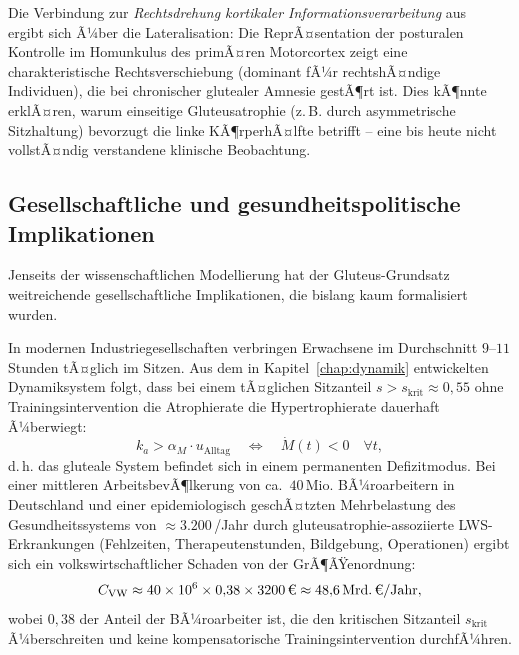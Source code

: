 ﻿\documentclass[12pt,a4paper]{report}
\theoremstyle{plain}
\theoremstyle{definition}
\theoremstyle{remark}
\newcommand{\euro}{\texteuro}    %
\begin{document}
	Die Verbindung zur \emph{Rechtsdrehung kortikaler Informationsverarbeitung}
	aus~\cite{epp2026wolke} ergibt sich Ã¼ber die Lateralisation:
	Die ReprÃ¤sentation der posturalen Kontrolle im Homunkulus des
	primÃ¤ren Motorcortex zeigt eine charakteristische Rechtsverschiebung
	(dominant fÃ¼r rechtshÃ¤ndige Individuen), die bei chronischer
	glutealer Amnesie gestÃ¶rt ist. Dies kÃ¶nnte erklÃ¤ren, warum
	einseitige Gluteusatrophie (z.\,B. durch asymmetrische Sitzhaltung)
	bevorzugt die linke KÃ¶rperhÃ¤lfte betrifft -- eine bis heute nicht
	vollstÃ¤ndig verstandene klinische Beobachtung.
	
	\subsection{Gesellschaftliche und gesundheitspolitische Implikationen}
	\label{subsec:gesellschaft}
	
	Jenseits der wissenschaftlichen Modellierung hat der Gluteus-Grundsatz
	weitreichende gesellschaftliche Implikationen, die bislang kaum formalisiert wurden.
	
	In modernen Industriegesellschaften verbringen Erwachsene im Durchschnitt
	$9$--$11$ Stunden tÃ¤glich im Sitzen. Aus dem in Kapitel~\ref{chap:dynamik}
	entwickelten Dynamiksystem folgt, dass bei einem tÃ¤glichen Sitzanteil
	$s > s_{\mathrm{krit}} \approx 0{,}55$ ohne Trainingsintervention
	die Atrophierate die Hypertrophierate dauerhaft Ã¼berwiegt:
	\[
	k_a > \alpha_M \cdot u_\mathrm{Alltag} \quad \Longleftrightarrow \quad
	\dot{M}(t) < 0 \quad \forall t,
	\]
	d.\,h. das gluteale System befindet sich in einem permanenten Defizitmodus.
	Bei einer mittleren ArbeitsbevÃ¶lkerung von ca.~$40\,\mathrm{Mio.}$
	BÃ¼roarbeitern in Deutschland und einer epidemiologisch geschÃ¤tzten
	Mehrbelastung des Gesundheitssystems von $\approx 3.200$\,\euro{}/Jahr
	durch gluteusatrophie-assoziierte LWS-Erkrankungen (Fehlzeiten,
	Therapeutenstunden, Bildgebung, Operationen) ergibt sich ein
	volkswirtschaftlicher Schaden von der GrÃ¶ÃŸenordnung:
	\[
	C_{\mathrm{VW}} \approx 40 \times 10^6 \times 0{,}38 \times 3200\,\text{\euro}
	\approx 48{,}6\,\text{Mrd.}\,\text{\euro}/\text{Jahr},
	\]
	wobei $0{,}38$ der Anteil der BÃ¼roarbeiter ist, die den kritischen
	Sitzanteil $s_{\mathrm{krit}}$ Ã¼berschreiten und keine kompensatorische
	Trainingsintervention durchfÃ¼hren.
	
\end{document}
